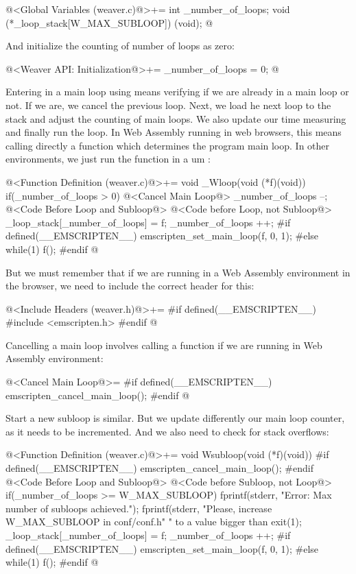 \iniciocodigo
@<Global Variables (weaver.c)@>+=
int _number_of_loops;
void (*_loop_stack[W_MAX_SUBLOOP]) (void);
@
\fimcodigo

And initialize the counting of number of loops as zero:

\iniciocodigo
@<Weaver API: Initialization@>+=
_number_of_loops = 0;
@
\fimcodigo

Entering in a main loop using  means verifying if we
are already in a main loop or not. If we are, we cancel the previous
loop. Next, we load he next loop to the stack and adjust the counting
of main loops. We also update our time measuring and finally run the
loop. In Web Assembly running in web browsers, this means calling
directly a function which determines the program main loop. In other
environments, we just run the function in a um :

\iniciocodigo
@<Function Definition (weaver.c)@>+=
void _Wloop(void (*f)(void)){
  if(_number_of_loops > 0){
    @<Cancel Main Loop@>
    _number_of_loops --;
  }
  @<Code Before Loop and Subloop@>
  @<Code before Loop, not Subloop@>
  _loop_stack[_number_of_loops] = f;
  _number_of_loops ++;
#if defined(__EMSCRIPTEN__)
  emscripten_set_main_loop(f, 0, 1);
#else
  while(1)
    f();
#endif
}
@
\fimcodigo

But we must remember that if we are running in a Web Assembly
environment in the browser, we need to include the correct header for
this:

\iniciocodigo
@<Include Headers (weaver.h)@>+=
#if defined(__EMSCRIPTEN__)
#include <emscripten.h>
#endif
@
\fimcodigo


Cancelling a main loop involves calling a function if we are running
in Web Assembly environment:

\iniciocodigo
@<Cancel Main Loop@>=
#if defined(__EMSCRIPTEN__)
emscripten_cancel_main_loop();
#endif
@
\fimcodigo

Start a new subloop is similar. But we update differently our main
loop counter, as it needs to be incremented. And we also need to check
for stack overflows:

\iniciocodigo
@<Function Definition (weaver.c)@>+=
void Wsubloop(void (*f)(void)){
#if defined(__EMSCRIPTEN__)
    emscripten_cancel_main_loop();
#endif
  @<Code Before Loop and Subloop@>
  @<Code before Subloop, not Loop@>
  if(_number_of_loops >= W_MAX_SUBLOOP){
    fprintf(stderr, "Error: Max number of subloops achieved.\n");
    fprintf(stderr, "Please, increase W_MAX_SUBLOOP in conf/conf.h"
            " to a value bigger than %
    exit(1);
  }
  _loop_stack[_number_of_loops] = f;
  _number_of_loops ++;
#if defined(__EMSCRIPTEN__)
  emscripten_set_main_loop(f, 0, 1);
#else
  while(1)
    f();
#endif
}
@
\fimcodigo


